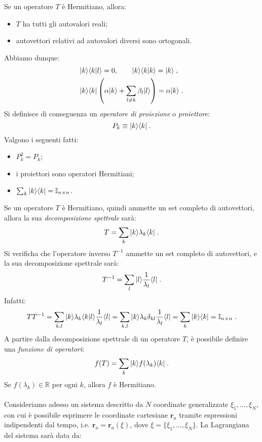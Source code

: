 Se un operatore $T$ è Hermitiano, allora:
\begin{itemize}
\item $T$ ha tutti gli autovalori reali;
\item autovettori relativi ad autovalori diversi sono ortogonali.
\end{itemize}
Abbiamo dunque:	
\begin{align}
&|k\rangle\langle k|l\rangle=0,\qquad |k\rangle\langle k|k\rangle=|k\rangle\;, \\
&|k\rangle\langle k|\left(\alpha|k\rangle+\sum_{l\ne k}\beta_l|l\rangle\right)=\alpha|k\rangle\;.
\end{align}
Si definisce di conseguenza un \textit{operatore di proiezione} o \textit{proiettore}:
\begin{equation}
P_k\equiv |k\rangle\langle k|\;.
\end{equation}
Valgono i seguenti fatti:
\begin{itemize}
\item $P_k^2=P_k$;
\item i proiettori sono operatori Hermitiani;
\item $\sum_k |k\rangle\langle k|=\mathbb{I}_{n\times n}$.
\end{itemize}
Se un operatore $T$ è Hermitiano, quindi ammette un set completo di autovettori, allora la sua \textit{decomposizione spettrale} sarà:
\begin{equation}
T=\sum_k |k\rangle\lambda_k\langle k|\;.
\end{equation}
Si verificha che l'operatore inverso $T^{-1}$ ammette un set completo di autovettori, e la sua decomposizione spettrale sarà:
\begin{equation}
T^{-1}=\sum_l |l\rangle\frac{1}{\lambda_l}\langle l|\;.
\end{equation}
Infatti:
\begin{equation}
TT^{-1}=\sum_{k,l}|k\rangle\lambda_k\langle k|l\rangle\frac{1}{\lambda_l}\langle l|=\sum_{k,l}|k\rangle\lambda_k\delta_{kl}\frac{1}{\lambda_l}\langle l|=\sum_k|k\rangle\langle k|=\mathbb{I}_{n\times n}\;.
\end{equation}
A partire dalla decomposizione spettrale di un operatore $T$, è possibile definire una \textit{funzione di operatori}:
\begin{equation}
f(T)=\sum_k |k\rangle f(\lambda_k)\langle k|\;.
\end{equation}
Se $f(\lambda_k)\in\mathbb{R}$ per ogni $k$, allora $f$ è Hermitiano. \\
\\
Consideriamo adesso un sistema descritto da $N$ coordinate generalizzate $\xi_1,\ldots,\xi_N$, con cui è possibile esprimere le coordinate cartesiane $\mathbf{r}_{a}$ tramite espressioni indipendenti dal tempo, i.e. $\mathbf{r}_a=\mathbf{r}_a(\xi)$, dove $\xi=\{\xi_1,\ldots,\xi_N\}$. La Lagrangiana del sistema sarà data da:
